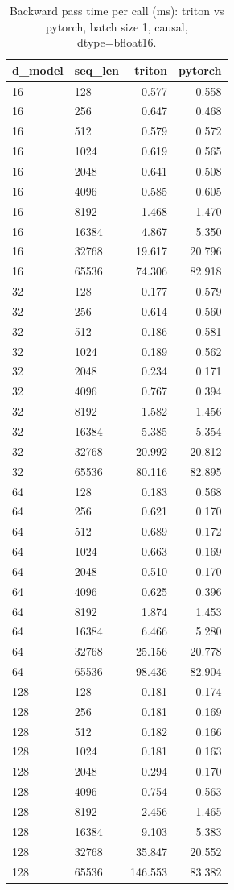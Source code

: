 \begin{table}
\centering
\begin{tabular}{llrr}
\toprule
d\_model & seq\_len & triton & pytorch \\
\midrule
16 & 128 & 0.577 & 0.558 \\
16 & 256 & 0.647 & 0.468 \\
16 & 512 & 0.579 & 0.572 \\
16 & 1024 & 0.619 & 0.565 \\
16 & 2048 & 0.641 & 0.508 \\
16 & 4096 & 0.585 & 0.605 \\
16 & 8192 & 1.468 & 1.470 \\
16 & 16384 & 4.867 & 5.350 \\
16 & 32768 & 19.617 & 20.796 \\
16 & 65536 & 74.306 & 82.918 \\
32 & 128 & 0.177 & 0.579 \\
32 & 256 & 0.614 & 0.560 \\
32 & 512 & 0.186 & 0.581 \\
32 & 1024 & 0.189 & 0.562 \\
32 & 2048 & 0.234 & 0.171 \\
32 & 4096 & 0.767 & 0.394 \\
32 & 8192 & 1.582 & 1.456 \\
32 & 16384 & 5.385 & 5.354 \\
32 & 32768 & 20.992 & 20.812 \\
32 & 65536 & 80.116 & 82.895 \\
64 & 128 & 0.183 & 0.568 \\
64 & 256 & 0.621 & 0.170 \\
64 & 512 & 0.689 & 0.172 \\
64 & 1024 & 0.663 & 0.169 \\
64 & 2048 & 0.510 & 0.170 \\
64 & 4096 & 0.625 & 0.396 \\
64 & 8192 & 1.874 & 1.453 \\
64 & 16384 & 6.466 & 5.280 \\
64 & 32768 & 25.156 & 20.778 \\
64 & 65536 & 98.436 & 82.904 \\
128 & 128 & 0.181 & 0.174 \\
128 & 256 & 0.181 & 0.169 \\
128 & 512 & 0.182 & 0.166 \\
128 & 1024 & 0.181 & 0.163 \\
128 & 2048 & 0.294 & 0.170 \\
128 & 4096 & 0.754 & 0.563 \\
128 & 8192 & 2.456 & 1.465 \\
128 & 16384 & 9.103 & 5.383 \\
128 & 32768 & 35.847 & 20.552 \\
128 & 65536 & 146.553 & 83.382 \\
\bottomrule
\end{tabular}
\caption{Backward pass time per call (ms): triton vs pytorch, batch size 1, causal, dtype=bfloat16.}
\label{tab:flash_backward_compare_bfloat16}
\end{table}
